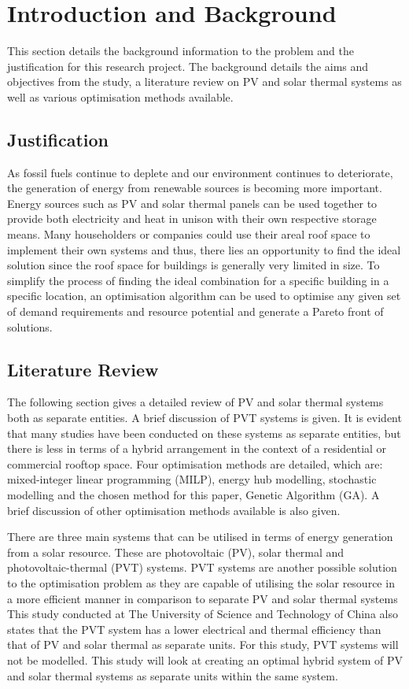 \section{Introduction and Background}

This section details the background information to the problem and the justification for this research project. The background details the aims and objectives from the study, a literature review on PV and solar thermal systems as well as various optimisation methods available.

\subsection{Justification}

As fossil fuels continue to deplete and our environment continues to deteriorate, the generation of energy from renewable sources is becoming more important. Energy sources such as PV and solar thermal panels can be used together to provide both electricity and heat in unison with their own respective storage means. Many householders or companies could use their areal roof space to implement their own systems and thus, there lies an opportunity to find the ideal solution since the roof space for buildings is generally very limited in size. To simplify the process of finding the ideal combination for a specific building in a specific location, an optimisation algorithm can be used to optimise any given set of demand requirements and resource potential and generate a Pareto front of solutions.

\subsection{Literature Review}

The following section gives a detailed review of PV and solar thermal systems both as separate entities. A brief discussion of PVT systems is given. It is evident that many studies have been conducted on these systems as separate entities, but there is less in terms of a hybrid arrangement in the context of a residential or commercial rooftop space. Four optimisation methods are detailed, which are: mixed-integer linear programming (MILP), energy hub modelling, stochastic modelling and the chosen method for this paper, Genetic Algorithm (GA). A brief discussion of other optimisation methods available is also given. 

There are three main systems that can be utilised in terms of energy 
generation from a solar resource. These are photovoltaic (PV), 
solar thermal and photovoltaic-thermal (PVT) systems.
PVT systems are another possible solution to the optimisation problem 
as they are capable of utilising the solar resource in a more efficient 
manner in comparison to separate PV and solar thermal systems \cite{HE20113369}
This study conducted at The University of Science and Technology of China 
also states that the PVT system has a lower electrical and thermal efficiency 
than that of PV and solar thermal as separate units. For this study, 
PVT systems will not be modelled. This study will look at creating an 
optimal hybrid system of PV and solar thermal systems as separate units 
within the same system.

